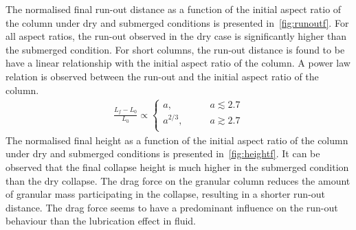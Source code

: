 The normalised final run-out distance as a function of the initial aspect ratio 
of the column under dry and submerged conditions is presented 
in~\cref{fig:runoutf}. For all aspect ratios, the run-out observed in 
the dry case is significantly higher than the submerged condition. For short 
columns, the run-out distance is found to be have a linear relationship with 
the initial aspect ratio of the column.  A power law 
relation is observed between the run-out and the initial aspect ratio of the 
column.
%
\begin{align}
\frac{L_{\textit{f}}-L_{\textit{0}}}{L_{\textit{0}}} \propto 
\begin{cases}
a, &\qquad \textit{a}\lesssim 2.7 \\
a^{2/3}, &\qquad \textit{a} \gtrsim 2.7 \\
\end{cases}
\end{align}
%
The normalised final height as a function of the initial aspect ratio 
of the column under dry and submerged conditions is presented 
in~\cref{fig:heightf}. It can be observed that the 
final collapse height is much higher in the submerged condition than the dry 
collapse. The drag force on the granular column reduces the amount of 
granular mass participating in the collapse, resulting in a shorter run-out 
distance. The drag force seems to have a predominant influence on the run-out 
behaviour than the lubrication effect in fluid.


